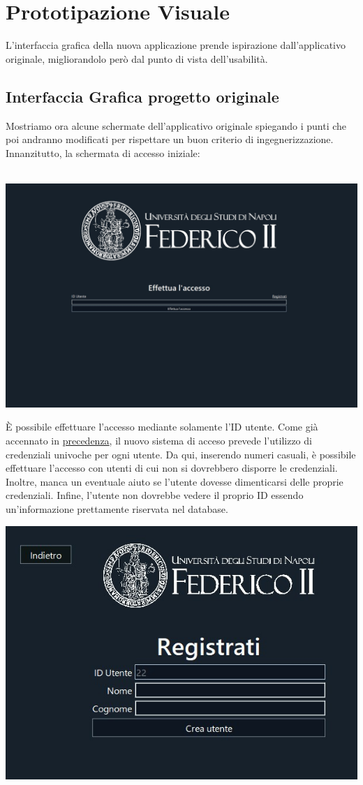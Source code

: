 \raggedright{\section{Prototipazione Visuale}}
L'interfaccia grafica della nuova applicazione prende ispirazione dall'applicativo originale, migliorandolo però dal punto di vista dell'usabilità. \\
\raggedright{\subsection{Interfaccia Grafica progetto originale}}
Mostriamo ora alcune schermate dell'applicativo originale spiegando i punti che poi andranno modificati per rispettare un buon criterio di ingegnerizzazione. \\ Innanzitutto, la schermata di accesso iniziale:  
        \\~\\
         \begin{center}
            \includegraphics[width=.60\textwidth]{Immagini/VecchioProgetto/login.jpg} 
        \end{center}
È possibile effettuare l'accesso mediante solamente l'ID utente. Come già accennato in \hyperref[nuovo:accesso]{precedenza}, il nuovo sistema di acceso prevede l'utilizzo di credenziali univoche per ogni utente. Da qui, inserendo numeri casuali, è possibile effettuare l'accesso con utenti di cui non si dovrebbero disporre le credenziali. Inoltre, manca un eventuale aiuto se l'utente dovesse dimenticarsi delle proprie credenziali. Infine, l'utente non dovrebbe vedere il proprio ID essendo un'informazione prettamente riservata nel database.
         \begin{center}
            \includegraphics[width=.60\textwidth]{Immagini/VecchioProgetto/registrazione.jpg} 
        \end{center}
